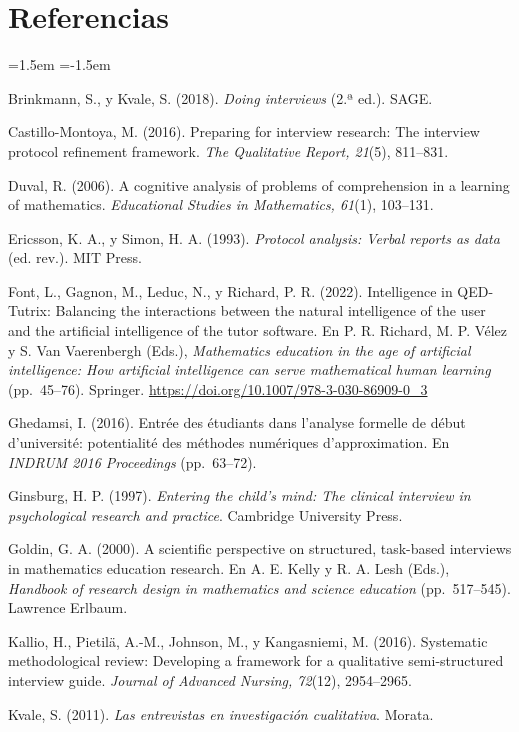 \documentclass[11pt,letterpaper]{article}
\begin{document}
\section*{Referencias}
\begin{list}{}{\leftmargin=1.5em \itemindent=-1.5em \itemsep=3pt \parsep=0pt}\small
\item Brinkmann, S., y Kvale, S. (2018). \emph{Doing interviews} (2.ª ed.). SAGE.
\item Castillo-Montoya, M. (2016). Preparing for interview research: The interview protocol refinement framework. \emph{The Qualitative Report, 21}(5), 811--831.
\item Duval, R. (2006). A cognitive analysis of problems of comprehension in a learning of mathematics. \emph{Educational Studies in Mathematics, 61}(1), 103--131.
\item Ericsson, K. A., y Simon, H. A. (1993). \emph{Protocol analysis: Verbal reports as data} (ed. rev.). MIT Press.
\item Font, L., Gagnon, M., Leduc, N., y Richard, P. R. (2022). Intelligence in QED-Tutrix: Balancing the interactions between the natural intelligence of the user and the artificial intelligence of the tutor software. En P. R. Richard, M. P. Vélez y S. Van Vaerenbergh (Eds.), \emph{Mathematics education in the age of artificial intelligence: How artificial intelligence can serve mathematical human learning} (pp.~45--76). Springer. \url{https://doi.org/10.1007/978-3-030-86909-0_3}
\item Ghedamsi, I. (2016). Entrée des étudiants dans l'analyse formelle de début d'université: potentialité des méthodes numériques d'approximation. En \emph{INDRUM 2016 Proceedings} (pp.~63--72).
\item Ginsburg, H. P. (1997). \emph{Entering the child's mind: The clinical interview in psychological research and practice}. Cambridge University Press.
\item Goldin, G. A. (2000). A scientific perspective on structured, task-based interviews in mathematics education research. En A. E. Kelly y R. A. Lesh (Eds.), \emph{Handbook of research design in mathematics and science education} (pp.~517--545). Lawrence Erlbaum.
\item Kallio, H., Pietilä, A.-M., Johnson, M., y Kangasniemi, M. (2016). Systematic methodological review: Developing a framework for a qualitative semi-structured interview guide. \emph{Journal of Advanced Nursing, 72}(12), 2954--2965.
\item Kvale, S. (2011). \emph{Las entrevistas en investigación cualitativa}. Morata.

\end{list}
\end{document}
